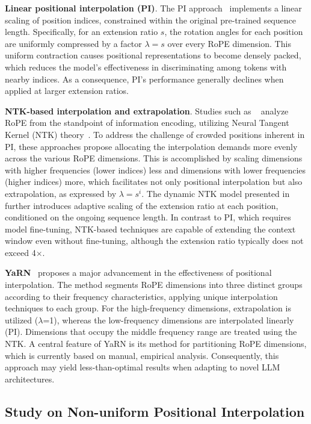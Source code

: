 \textbf{Linear positional interpolation (PI)}. The PI approach~\cite{pi} implements a linear scaling of position indices, constrained within the original pre-trained sequence length. Specifically, for an extension ratio $s$, the rotation angles for each position are uniformly compressed by a factor $\lambda=s$ over every RoPE dimension. This uniform contraction causes positional representations to become densely packed, which reduces the model’s effectiveness in discriminating among tokens with nearby indices. As a consequence, PI’s performance generally declines when applied at larger extension ratios.

\textbf{NTK-based interpolation and extrapolation}. Studies such as ~\cite{ntk,dynamicntk} analyze RoPE from the standpoint of information encoding, utilizing Neural Tangent Kernel (NTK) theory~\cite{jacot2018neural,tancik2020fourier}. To address the challenge of crowded positions inherent in PI, these approaches propose allocating the interpolation demands more evenly across the various RoPE dimensions. This is accomplished by scaling dimensions with higher frequencies (lower indices) less and dimensions with lower frequencies (higher indices) more, which facilitates not only positional interpolation but also extrapolation, as expressed by $\lambda = s^{i}$. The dynamic NTK model presented in~\cite{dynamicntk} further introduces adaptive scaling of the extension ratio at each position, conditioned on the ongoing sequence length. In contrast to PI, which requires model fine-tuning, NTK-based techniques are capable of extending the context window even without fine-tuning, although the extension ratio typically does not exceed 4$\times$.

\textbf{YaRN}~\cite{yarn} proposes a major advancement in the effectiveness of positional interpolation. The method segments RoPE dimensions into three distinct groups according to their frequency characteristics, applying unique interpolation techniques to each group. For the high-frequency dimensions, extrapolation is utilized ($\lambda$=1), whereas the low-frequency dimensions are interpolated linearly (PI). Dimensions that occupy the middle frequency range are treated using the NTK. A central feature of YaRN is its method for partitioning RoPE dimensions, which is currently based on manual, empirical analysis. Consequently, this approach may yield less-than-optimal results when adapting to novel LLM architectures.

\subsection{Study on Non-uniform Positional Interpolation}

